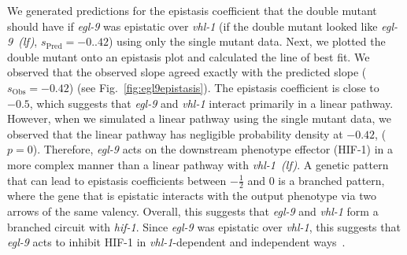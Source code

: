 \documentclass[9pt,twocolumn,twoside]{pnas-new}
\newcommand{\gene}[1]{\emph{#1}}
\newcommand{\egl}{\emph{egl-9~(lf)}}
\newcommand{\vhl}{\emph{vhl-1~(lf)}}
\newcommand{\hifp}{HIF-1}
\begin{document}
We generated predictions for the epistasis coefficient that the double mutant
should have if \gene{egl-9} was epistatic over \gene{vhl-1} (if the double mutant
looked like \egl{}, $s_\mathrm{Pred}=-0..42$)
using only the single mutant data. Next, we plotted the double mutant onto an
epistasis plot and calculated the line of best fit. We observed that the observed
slope agreed exactly with the predicted slope ($s_\mathrm{Obs}=-0.42$)
(see Fig.~\ref{fig:egl9epistasis}). The epistasis coefficient is close to $-0.5$,
which suggests that \gene{egl-9} and \gene{vhl-1} interact primarily in a linear
pathway. However, when we simulated a linear pathway using the single mutant data,
we observed that the linear pathway has negligible probability density at $-0.42$,
($p = 0$).
Therefore, \gene{egl-9} acts on the downstream phenotype effector (\hifp{}) in a
more complex manner than a linear pathway with \vhl{}.  A genetic pattern that
can lead to epistasis coefficients between $-\frac{1}{2}$ and $0$ is a branched
pattern, where the gene that is epistatic interacts with the output
phenotype via two arrows of the same valency.
Overall, this suggests that \gene{egl-9} and \gene{vhl-1} form a branched circuit
with \gene{hif-1}. Since \gene{egl-9} was epistatic over \gene{vhl-1}, this
suggests that \gene{egl-9} acts to inhibit \hifp{} in \gene{vhl-1}-dependent and
independent ways~\cite{Shao2009}.
\end{document}
